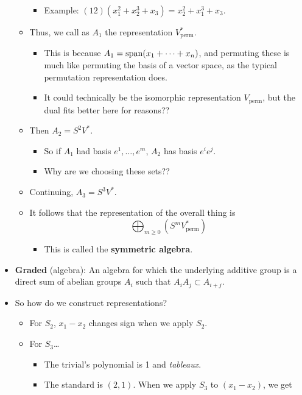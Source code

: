 \documentclass[../notes.tex]{subfiles}
\begin{document}
\begin{itemize}
\begin{itemize}
\begin{itemize}
            \item Example: $(12)(x_1^2+x_2^3+x_3)=x_2^2+x_1^3+x_3$.
        \end{itemize}
        \item Thus, we call as $A_1$ the representation $V_\text{perm}^*$.
        \begin{itemize}
            \item This is because $A_1=\operatorname{span}(x_1+\cdots+x_n)$, and permuting these is much like permuting the basis of a vector space, as the typical permutation representation does.
            \item It could technically be the isomorphic representation $V_\text{perm}$, but the dual fits better here for reasons??
        \end{itemize}
        \item Then $A_2=S^2V^*$.
        \begin{itemize}
            \item So if $A_1$ had basis $e^1,\dots,e^m$, $A_2$ has basis $e^ie^j$.
            \item Why are we choosing these sets??
        \end{itemize}
        \item Continuing, $A_3=S^3V^*$.
        \item It follows that the representation of the overall thing is
        \begin{equation*}
            \bigoplus_{m\geq 0}(S^mV_\text{perm}^*)
        \end{equation*}
        \begin{itemize}
            \item This is called the \textbf{symmetric algebra}.
        \end{itemize}
    \end{itemize}
    \item \textbf{Graded} (algebra): An algebra for which the underlying additive group is a direct sum of abelian groups $A_i$ such that $A_iA_j\subset A_{i+j}$.
    \item So how do we construct representations?
    \begin{itemize}
        \item For $S_2$, $x_1-x_2$ changes sign when we apply $S_2$.
        \item For $S_3$\dots
        \begin{itemize}
            \item The trivial's polynomial is 1 and \emph{tableaux}.
            \item The standard is $(2,1)$. When we apply $S_3$ to $(x_1-x_2)$, we get

\end{itemize}
\end{itemize}
\end{itemize}
\end{document}
